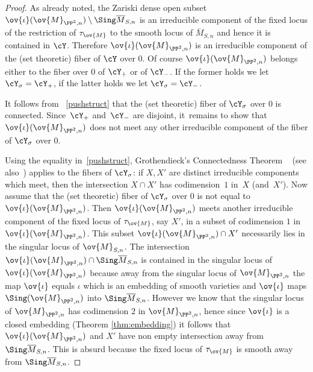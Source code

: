 \begin{proof}
As already noted, the Zariski dense open subset
$\ov{\iota}(\ov{M}_{\PP^2,n})\setminus\Sing\overline{M}_{S,n}$ is an irreducible component of the fixed locus of the restriction of $\tau_{\ov{M}}$ to the smooth locus of $\overline{M}_{S,n}$ and hence it is contained in $\cY$.
Therefore $\ov{\iota}(\ov{M}_{\PP^2,n})$ is an irreducible component of the (set theoretic) fiber of $\cY$ over $0$.
Of course $\ov{\iota}(\ov{M}_{\PP^2,n})$ belongs either to the fiber over $0$ of $\cY_{+}$ or of $\cY_{-}$.
If the former holds we let $\cY_{\sigma}=\cY_{+}$, if the latter holds we let $\cY_{\sigma}=\cY_{-}$.

It follows from ~\eqref{pushstruct} that the (set theoretic) fiber of $\cY_{\sigma}$ over $0$ is connected. Since~$\cY_{+}$ and~$\cY_{-}$ are disjoint, it~remains to show that $\ov{\iota}(\ov{M}_{\PP^2,n})$ does not meet any other irreducible component of the fiber of $\cY_{\sigma}$ over $0$.

Using the equality in~\eqref{pushstruct}, Grothendieck's Connectedness Theorem ~\cite[Th.\,7]{Faltings:Formal} (see also~) applies to the fibers of $\cY_{\sigma}$: if $X, X'$ are distinct irreducible components which meet, then the intersection $X\cap X'$ has codimension~$1$ in~$X$ (and~$X'$).
Now assume that the (set theoretic) fiber of $\cY_{\sigma}$ over $0$ is not equal to $\ov{\iota}(\ov{M}_{\PP^2,n})$.
Then $\ov{\iota}(\ov{M}_{\PP^2,n})$ meets another irreducible component of the fixed locus of $\tau_{\ov{M}}$, say $X'$, in a subset of codimension $1$ in $\ov{\iota}(\ov{M}_{\PP^2,n})$. This subset $\ov{\iota}(\ov{M}_{\PP^2,n})\cap X'$ necessarily lies in the singular locus of $\ov{M}_{S,n}$. The intersection $\ov{\iota}(\ov{M}_{\PP^2,n})\cap\Sing\overline{M}_{S,n}$ is contained in the singular locus of $\ov{\iota}(\ov{M}_{\PP^2,n})$ because away from the singular locus of $\ov{M}_{\PP^2,n}$ the map $\ov{\iota}$ equals $\iota$ which is an embedding of smooth varieties and $\ov{\iota}$ maps $\Sing(\ov{M}_{\PP^2,n})$ into $\Sing\overline{M}_{S,n}$. However we know that the singular locus of $\ov{M}_{\PP^2,n}$ has codimension $2$ in $\ov{M}_{\PP^2,n}$, hence since $\ov{\iota}$ is a closed embedding (Theorem \ref{thm:embedding}) it follows that $\ov{\iota}(\ov{M}_{\PP^2,n})$ and $X'$ have non empty intersection away from $\Sing\overline{M}_{S,n}$.
This is absurd because the fixed locus of $\tau_{\ov{M}}$ is smooth away from $\Sing\overline{M}_{S,n}$.
\end{proof}

